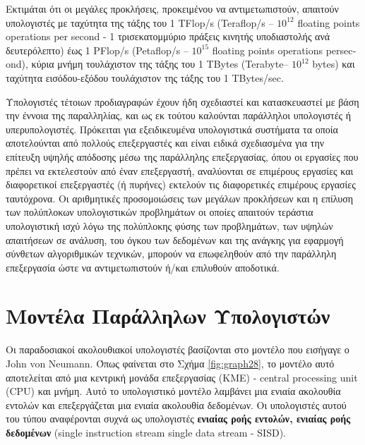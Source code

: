 \documentclass[12pt,a4paper]{article}
\begin{document}
Εκτιμάται ότι οι μεγάλες προκλήσεις, προκειμένου να αντιμετωπιστούν, απαιτούν
υπολογιστές με ταχύτητα της τάξης του 1 \foreignlanguage{english}{TFlop/s} (\foreignlanguage{english}{Teraflop/s} -- $10^{12}$ \foreignlanguage{english}{floating
points operations per second} - 1 τρισεκατομμύριο πράξεις κινητής υποδιαστολής
ανά δευτερόλεπτο) έως 1 \foreignlanguage{english}{PFlop/s} (\foreignlanguage{english}{Petaflop/s} -- $10^{15}$ \foreignlanguage{english}{floating points operations 
persecond}), κύρια μνήμη τουλάχιστον της τάξης του 1 \foreignlanguage{english}{TBytes} (\foreignlanguage{english}{Terabyte}-- $10^{12}$ \foreignlanguage{english}{bytes})
και ταχύτητα εισόδου-εξόδου τουλάχιστον της τάξης του 1 \foreignlanguage{english}{TBytes/sec}.

Υπολογιστές τέτοιων προδιαγραφών έχουν ήδη σχεδιαστεί και κατασκευαστεί
με βάση την έννοια της παραλληλίας, και ως εκ τούτου καλούνται παράλληλοι
υπολογιστές ή υπερυπολογιστές. Πρόκειται για εξειδικευμένα υπολογιστικά συστήματα
τα οποία αποτελούνται από πολλούς επεξεργαστές και είναι ειδικά σχεδιασμένα
για την επίτευξη υψηλής απόδοσης μέσω της παράλληλης επεξεργασίας, όπου
οι εργασίες που πρέπει να εκτελεστούν από έναν επεξεργαστή, αναλύονται σε
επιμέρους εργασίες και διαφορετικοί επεξεργαστές (ή πυρήνες) εκτελούν τις
διαφορετικές επιμέρους εργασίες ταυτόχρονα. Οι αριθμητικές προσομοιώσεις
των μεγάλων προκλήσεων και η επίλυση των πολύπλοκων υπολογιστικών προβλημάτων
οι οποίες απαιτούν τεράστια υπολογιστική ισχύ λόγω της πολύπλοκης φύσης
των προβλημάτων, των υψηλών απαιτήσεων σε ανάλυση, του όγκου των δεδομένων
και της ανάγκης για εφαρμογή σύνθετων αλγοριθμικών τεχνικών, μπορούν να
επωφεληθούν από την παράλληλη επεξεργασία ώστε να αντιμετωπιστούν ή/και
επιλυθούν αποδοτικά.
\vspace{1.00cm}
\section{Μοντέλα Παράλληλων Υπολογιστών}

Οι παραδοσιακοί ακολουθιακοί υπολογιστές βασίζονται στο μοντέλο που εισήγαγε ο
\foreignlanguage{english}{John von Neumann}. Όπως φαίνεται στο Σχήμα \ref{fig:graph28}, το μοντέλο αυτό αποτελείται από
μια κεντρική μονάδα επεξεργασίας (ΚΜΕ) - \foreignlanguage{english}{central processing unit (CPU)} και μνήμη. Αυτό το υπολογιστικό μοντέλο
λαμβάνει μια ενιαία ακολουθία εντολών και επεξεργάζεται μια ενιαία ακολουθία
δεδομένων. Οι υπολογιστές αυτού του τύπου αναφέρονται συχνά ως υπολογιστές
\textbf{ενιαίας ροής εντολών, ενιαίας ροής δεδομένων} (\foreignlanguage{english}{single instruction stream single data stream - SISD}).
\end{document}
